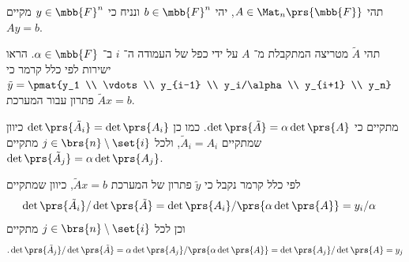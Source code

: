 \documentclass[a4paper,10pt,twoside,openany]{book}
\begin{document}
\begin{exercisechap}
תהי
$A \in \Mat_n\prs{\mbb{F}}$,
יהי
$b \in \mbb{F}^n$
ונניח כי
$y \in \mbb{F}^n$
מקיים
$Ay = b$.

תהי
$\tilde{A}$
מטריצה המתקבלת מ־%
$A$
על ידי כפל של העמודה ה־%
$i$
ב־%
$\alpha \in\mbb{F}$.
הראו ישירות לפי כלל קרמר כי
$\tilde{y} = \pmat{y_1 \\ \vdots \\ y_{i-1} \\ y_i/\alpha \\ y_{i+1} \\ y_n}$
פתרון עבור המערכת
$\tilde{A}x = b$.
\end{exercisechap}

\begin{solution}
מתקיים כי
$\det\prs{\tilde{A}} = \alpha \det\prs{A}$.
כמו כן
$\det\prs{\tilde{A}_i} = \det\prs{A_i}$
כיוון שמתקיים
$\tilde{A}_i = A_i$,
ולכל
$j \in \brs{n} \setminus \set{i}$
מתקיים
$\det\prs{\tilde{A}_j} = \alpha \det\prs{A_j}$.

לפי כלל קרמר נקבל כי
$\tilde{y}$
פתרון של המערכת
$\tilde{A} x = b$,
כיוון שמתקיים
\begin{align*}
\det\prs{\tilde{A}_i} / \det\prs{\tilde{A}} &= \det\prs{A_i} / \prs{\alpha \det\prs{A}} = y_i / \alpha
\end{align*}
וכן לכל
$j \in \brs{n} \setminus \set{i}$
מתקיים
\begin{align*}
\text{.} \det\prs{\tilde{A}_j} / \det\prs{\tilde{A}} = \alpha \det\prs{A_j} / \prs{\alpha \det\prs{A}} = \det\prs{A_j} / \det\prs{A} = y_j
\end{align*}
\end{solution}

\printbibliography
\end{document}
